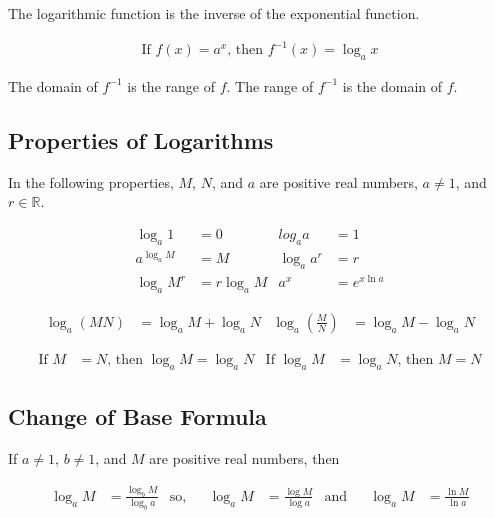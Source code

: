 \documentclass[
12pt, %
letterpaper, %
fleqn, %
notitlepage %
]{article}
\numberwithin{equation}{section} %
\numberwithin{figure}{section} %
\numberwithin{table}{section} %
\begin{document}
The logarithmic function is the inverse of the exponential function.

\begin{align}
	\text{If }f(x)=a^x\text{, then }f^{-1}(x)=\log_{a}x
\end{align}

The domain of $f^{-1}$ is the range of $f$. The range of $f^{-1}$ is the domain of $f$.


\subsection*{Properties of Logarithms}

In the following properties, $M$, $N$, and $a$ are positive real numbers, $a\neq1$, and $r \in \mathbb{R}$.

\begin{align}
	\log_{a}1 &= 0 & log_{a}a &= 1 \\
	a^{\log_{a}M} &= M & \log_{a}a^r &= r \\
	\log_{a}M^r &= r\log_{a}M & a^x &= e^{x\ln{a}}
\end{align}

\begin{align}
	\log_{a}(MN) &= \log_{a}M + \log_{a}N &
	\log_{a}\left(\frac{M}{N}\right) &= \log_{a}M - \log_{a}N 
\end{align}

\begin{align}
	\text{If }M &= N\text{, then }\log_{a}M = \log_{a}N &
	\text{If }\log_{a}M &= \log_{a}N\text{, then }M = N
\end{align}


\subsection*{Change of Base Formula}

If $a\neq1$, $b\neq1$, and $M$ are positive real numbers, then

\begin{align}
	\log_{a}M &= \frac{\log_{b}M}{\log_{b}a} & \text{so,} &&
	\log_{a}M &= \frac{\log{M}}{\log{a}} & \text{and} && \log_{a}M &= \frac{\ln{M}}{\ln{a}}
\end{align}

\end{document}
